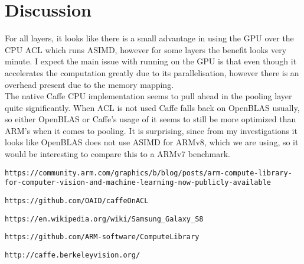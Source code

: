 \documentclass[12pt, a4paper, notitlepage]{report}
\begin{document}
\section*{Discussion}
For all layers, it looks like there is a small advantage in using the GPU over the CPU ACL which runs ASIMD, however for some layers the benefit looks very minute. I expect the main issue with running on the GPU is that even though it accelerates the computation greatly due to its parallelisation, however there is an overhead present due to the memory mapping.\\
The native Caffe CPU implementation seems to pull ahead in the pooling layer quite significantly. When ACL is not used Caffe falls back on OpenBLAS usually, so either OpenBLAS or Caffe's usage of it seems to still be more optimized than ARM's when it comes to pooling. It is surprising, since from my investigations it looks like OpenBLAS does not use ASIMD for ARMv8, which we are using, so it would be interesting to compare this to a ARMv7 benchmark.

\medskip

\begin{thebibliography}{9}

\begin{lstlisting}[breaklines,basicstyle=\ttfamily]
https://community.arm.com/graphics/b/blog/posts/arm-compute-library-for-computer-vision-and-machine-learning-now-publicly-available
\end{lstlisting}

\texttt{https://github.com/OAID/caffeOnACL}

\texttt{https://en.wikipedia.org/wiki/Samsung\_Galaxy\_S8}

\texttt{https://github.com/ARM-software/ComputeLibrary}

\texttt{http://caffe.berkeleyvision.org/}

\end{thebibliography}
\end{document}
